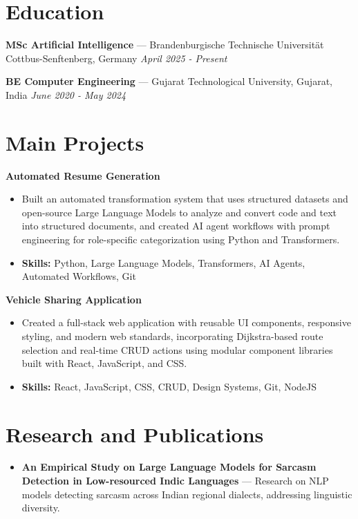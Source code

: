 \documentclass[a4paper,10pt]{article}
\begin{document}
\section*{Education}
\textbf{MSc Artificial Intelligence} — Brandenburgische Technische Universität Cottbus-Senftenberg, Germany \hfill \textit{April 2025 - Present}\par
\vspace{1.5pt}
\textbf{BE Computer Engineering} — Gujarat Technological University, Gujarat, India \hfill \textit{June 2020 - May 2024}\par

\section*{Main Projects}
\textbf{Automated Resume Generation}\par
\vspace{1pt}
\begin{itemize}
  \item Built an automated transformation system that uses structured datasets and open-source Large Language Models to analyze and convert code and text into structured documents, and created AI agent workflows with prompt engineering for role-specific categorization using Python and Transformers.
  \item \textbf{Skills:} Python, Large Language Models, Transformers, AI Agents, Automated Workflows, Git
\end{itemize}
\vspace{3pt}
\textbf{Vehicle Sharing Application}\par
\vspace{1pt}
\begin{itemize}
  \item Created a full-stack web application with reusable UI components, responsive styling, and modern web standards, incorporating Dijkstra-based route selection and real-time CRUD actions using modular component libraries built with React, JavaScript, and CSS.
  \item \textbf{Skills:} React, JavaScript, CSS, CRUD, Design Systems, Git, NodeJS
\end{itemize}

\section*{Research and Publications}
\begin{itemize}
\item \textbf{An Empirical Study on Large Language Models for Sarcasm Detection in Low-resourced Indic Languages} — Research on NLP models detecting sarcasm across Indian regional dialects, addressing linguistic diversity.
\end{itemize}
\end{document}
